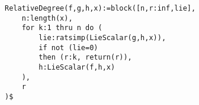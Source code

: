 \noindent
\begin{minipage}[t]{\textwidth}
\color{blue}
\begin{verbatim}
RelativeDegree(f,g,h,x):=block([n,r:inf,lie],
    n:length(x),
    for k:1 thru n do (
        lie:ratsimp(LieScalar(g,h,x)),
        if not (lie=0)
        then (r:k, return(r)),
        h:LieScalar(f,h,x) 
    ),
    r
)$
\end{verbatim}
\end{minipage}
